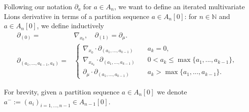\documentclass[a4paper,11pt,twoside]{article}
\numberwithin{equation}{section}
\theoremstyle{plain}
\newcommand{\bN}{\mathbb{N}}
\newcommand{\A}[1]{A_{#1}[0]}
\newcommand{\1}{\mathbbm{1}}
\begin{document}
	Following our notation $\partial_{a}$ for $a \in A_{n}$, we want to define an iterated multivariate Lions derivative in terms of a partition sequence $a\in \A{n}$: for $n\in \bN$ and $a\in A_n[0]$, we define inductively
	\begin{align*}
		\partial_{(0)} =& \nabla_{x_0}, \quad \partial_{(1)} = \partial_\mu.  
		\\
		\partial_{(a_1, ..., a_{k-1}, a_k)} =&
		\begin{cases} 
			\nabla_{x_0} \cdot \partial_{(a_1, ..., a_{k-1})} & \quad a_k =0, 
			\\
			\nabla_{x_{a_k}} \cdot \partial_{(a_1, ..., a_{k-1})} & \quad 0 < a_k \leq \max \{ a_1, ..., a_{k-1}\}, 
			\\
			\partial_\mu \cdot \partial_{(a_1, ..., a_{k-1})} & \quad a_k > \max \{a_1, ..., a_{k-1}\}.  
		\end{cases}
	\end{align*}
	
	
	For brevity, given a partition sequence $a\in A_n[0]$ we denote $a^{-}:=(a_i)_{i=1, ..., n-1}\in A_{n-1}[0]$. 
	
\end{document}
